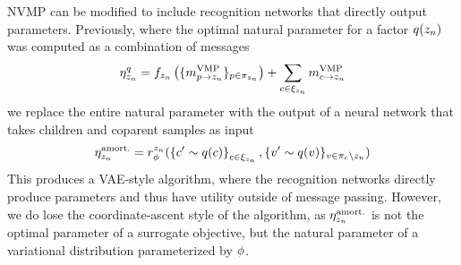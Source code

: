 NVMP can be modified to include
recognition networks that directly output parameters.
Previously, where the optimal natural parameter for a factor $q(z_n)$
was computed as a combination of messages
\begin{equation}
   \eta^q_{z_n} = f_{z_n}\left(\{m^{\text{VMP}}_{p \rightarrow z_n}\}_{p \in \pi_{z_n}}\right) + \sum_{c \in \xi_{z_n}} m^{\text{VMP}}_{c \rightarrow z_n}
\end{equation}
we replace the entire natural parameter with the output of a neural network
that takes children and coparent samples as input
\begin{equation}
   \eta^{\text{amort.}}_{z_n} = r^{z_n}_\phi(\left\{c'\sim q(c)\right\}_{c \in \xi_{z_n}}, \{v' \sim q(v)\}_{v \in \pi_c\backslash z_n})
\end{equation}
This produces a VAE-style algorithm, where the recognition networks
directly produce parameters and thus have utility outside of message passing.
However, we do lose the coordinate-ascent style of the algorithm, as
$\eta^{\text{amort.}}_{z_n}$ is not the optimal parameter
of a surrogate objective, but the natural parameter of a variational
distribution parameterized by $\phi$.
